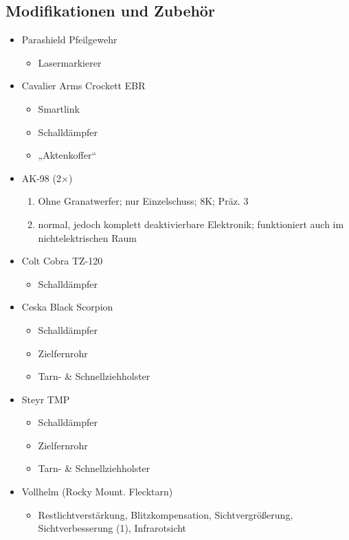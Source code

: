 {\begin{multicols}{2}
\section*{Modifikationen und Zubehör}
\begin{itemize}
	\item Parashield Pfeilgewehr
		\begin{itemize}
			\item  Lasermarkierer
		\end{itemize}
	\item Cavalier Arms Crockett EBR
		\begin{itemize}
			\item Smartlink
			\item Schalldämpfer
			\item „Aktenkoffer“
		\end{itemize}
	\item AK-98 (2$\times$)
		\begin{enumerate}
			\item Ohne Granatwerfer; nur Einzelschuss; 8K; Präz. 3
			\item normal, jedoch komplett deaktivierbare Elektronik; funktioniert auch im nichtelektrischen Raum
		\end{enumerate}
	\item Colt Cobra TZ-120
		\begin{itemize}
			\item Schalldämpfer
		\end{itemize}
	\item Ceska Black Scorpion
		\begin{itemize}
			\item Schalldämpfer
			\item Zielfernrohr
			\item Tarn- \& Schnellziehholster
		\end{itemize}
	\item Steyr TMP
		\begin{itemize}
			\item Schalldämpfer
			\item Zielfernrohr
			\item Tarn- \& Schnellziehholster
		\end{itemize}
	\item Vollhelm (Rocky Mount. Flecktarn)
		\begin{itemize}
			\item Restlichtverstärkung, Blitzkompensation, Sichtvergrößerung,
						Sichtverbesserung (1), Infrarotsicht
		\end{itemize}
\end{itemize}



\end{multicols}}

